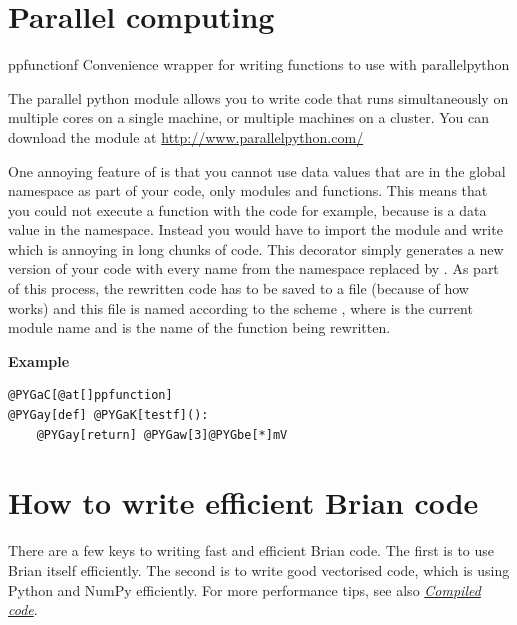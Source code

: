 \documentclass[letterpaper,10pt,english]{manual}
\begin{document}
\resetcurrentobjects
{}

\hypertarget{index-74}{}\section{Parallel computing}

\hypertarget{brian.ppfunction}{}\begin{funcdesc}{ppfunction}{f}
Convenience wrapper for writing functions to use with parallelpython

The parallel python module  allows you to write code that runs simultaneously
on multiple cores on a single machine, or multiple machines on a cluster. You can
download the module at \href{http://www.parallelpython.com/}{http://www.parallelpython.com/}

One annoying feature of  is that you cannot use data values that are in the
global namespace as part of your code, only modules and functions. This means that
you could not execute a function with the code  for example, because 
is a data value in the  namespace. Instead you would have to import
the  module and write  which is annoying in long chunks
of code. This decorator simply generates a new version of your code with every
name  from the  namespace replaced by . As part of this
process, the rewritten code has to be saved to a file (because of how  works)
and this file is named according to the scheme
, where  is the current
module name and  is the name of the function being rewritten.

\textbf{Example}

\begin{Verbatim}[commandchars=@\[\]]
@PYGaC[@at[]ppfunction]
@PYGay[def] @PYGaK[testf]():
    @PYGay[return] @PYGaw[3]@PYGbe[*]mV
\end{Verbatim}
\end{funcdesc}

\resetcurrentobjects
{}

\hypertarget{index-3}{}\section{How to write efficient Brian code}

There are a few keys to writing fast and efficient Brian code. The
first is to use Brian itself efficiently. The second is to write
good vectorised code, which is using Python and NumPy efficiently.
For more performance tips, see also \hyperlink{compiled-code}{\emph{Compiled code}}.
\end{document}
